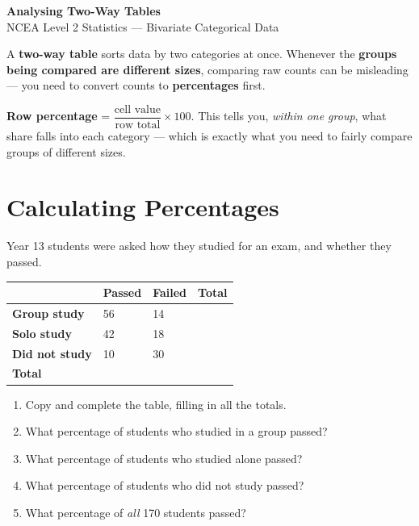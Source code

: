 \documentclass[11pt]{article}
\newcommand{\ans}{\hrulefill}
\newcommand{\anshere}{\par\vspace{0.3em}\noindent\ans\par\vspace{0.3em}}
\begin{document}
\thispagestyle{firstpage}

\begin{center}
  {\Large\bfseries Analysing Two-Way Tables}\\[2pt]
  {\normalsize NCEA Level 2 Statistics --- Bivariate Categorical Data}
\end{center}

\vspace{0.4em}
\noindent A \textbf{two-way table} sorts data by two categories at once. Whenever the
\textbf{groups being compared are different sizes}, comparing raw counts can be
misleading --- you need to convert counts to \textbf{percentages} first.

\vspace{0.3em}
\noindent\textbf{Row percentage} = $\dfrac{\text{cell value}}{\text{row total}} \times 100$.
This tells you, \emph{within one group}, what share falls into each category --- which
is exactly what you need to fairly compare groups of different sizes.

\section{Calculating Percentages}
 Year 13 students were asked how they studied for an exam, and whether they
passed.

\begin{center}
\begin{tabular}{|L|Y|Y|Y|}
\hline
 & \textbf{Passed} & \textbf{Failed} & \textbf{Total} \\\hline
\textbf{Group study}    & 56 & 14 & \\\hline
\textbf{Solo study}     & 42 & 18 & \\\hline
\textbf{Did not study}  & 10 & 30 & \\\hline
\textbf{Total}          &    &    & \\\hline
\end{tabular}
\end{center}

\begin{enumerate}
  \item Copy and complete the table, filling in all the totals.
  \item What percentage of students who studied in a group passed?
  \anshere
  \item What percentage of students who studied alone passed?
  \anshere
  \item What percentage of students who did not study passed?
  \anshere
  \item What percentage of \emph{all} 170 students passed?
  \anshere
\end{enumerate}
\end{document}
